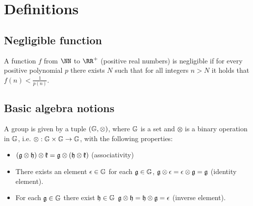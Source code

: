 
\section{Definitions}\label{preliminaries:definitions}

\subsection{Negligible function}\label{preliminaries:definitions:neg-func}

\begin{definition}
    A function $f$ from $\NN$ to $\RR^{+}$ (positive real numbers) is negligible if for every positive polynomial $p$ there exists $N$ such that for all integers $n>N$ it holds that $f(n)< \frac{1}{p(n)}$.
\end{definition}

\subsection{Basic algebra notions}\label{preliminaries:definitions:basic-algebra}

\begin{definition}
    A group is given by a tuple $(\mathbb{G}, \otimes)$, where $\mathbb{G}$ is a set and $\otimes$ is a binary operation in $\mathbb{G}$, i.e. $\otimes:\mathbb{G}\times\mathbb{G}\to \mathbb{G}$, with the following properties:
    \begin{itemize}
        \item $(\mathfrak{g} \otimes \mathfrak{h}) \otimes \mathfrak{k} = \mathfrak{g} \otimes (\mathfrak{h} \otimes \mathfrak{k})$ (associativity)
        \item There exists an element $\mathfrak{\epsilon} \in \mathbb{G}$ \suchthat{} for each $\mathfrak{g} \in \mathbb{G}$, $\mathfrak{g} \otimes \mathfrak{\epsilon} = \mathfrak{\epsilon} \otimes \mathfrak{g} = \mathfrak{g}$ (identity element).
        \item For each $\mathfrak{g} \in \mathbb{G}$ there exist $\mathfrak{h} \in \mathbb{G}$ \suchthat{} $\mathfrak{g} \otimes \mathfrak{h} = \mathfrak{h} \otimes \mathfrak{g} = \epsilon$ (inverse element).
    \end{itemize}
\end{definition}


